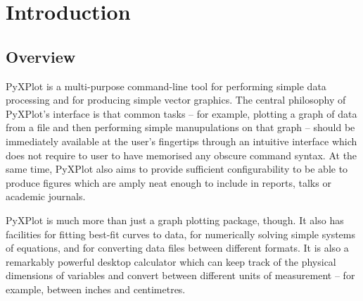 %
%
%
%
%



\chapter{Introduction} 

\label{ch:introduction}

\section{Overview}

{\sc PyXPlot} is a multi-purpose command-line tool for performing simple data
processing and for producing simple vector graphics. The central philosophy of
PyXPlot's interface is that common tasks -- for example, plotting a graph of
data from a file and then performing simple manupulations on that graph --
should be immediately available at the user's fingertips through an intuitive
interface which does not require to user to have memorised any obscure command
syntax.  At the same time, PyXPlot also aims to provide sufficient
configurability to be able to produce figures which are amply neat enough to
include in reports, talks or academic journals.

PyXPlot is much more than just a graph plotting package, though. It also has
facilities for fitting best-fit curves to data, for numerically solving simple
systems of equations, and for converting data files between different formats.
It is also a remarkably powerful desktop calculator which can keep track of the
physical dimensions of variables and convert between different units of
measurement -- for example, between inches and centimetres.

